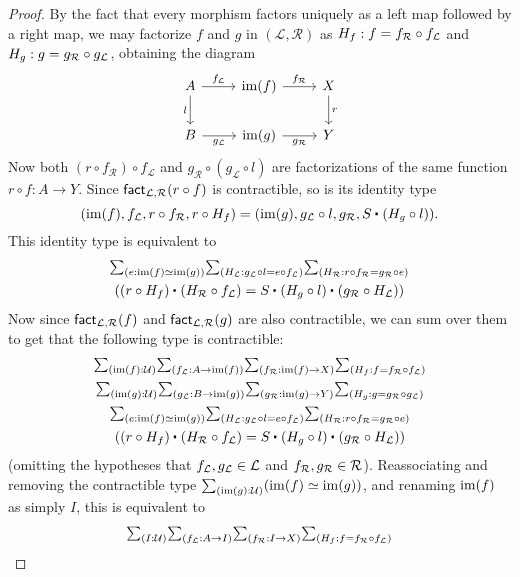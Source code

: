 \begin{proof}
By the fact that every morphism factors uniquely as a left map followed by a
right map, we may factorize $f$ and $g$ in $(\mathcal{L},\mathcal{R})$ as $H_f : f = f_{\mathcal{R}} \circ f_{\mathcal{L}}$ and $H_g : g = g_{\mathcal{R}} \circ g_{\mathcal{L}}$, obtaining the diagram
\begin{equation*}
\begin{tikzcd}
A \arrow[r,"f_{\mathcal{L}}"] \arrow[d,swap,"l"] & \im(f) \arrow[r,"f_{\mathcal{R}}"] & X \arrow[d,"r"] \\
B \arrow[r,swap,"g_{\mathcal{L}}"] & \im(g) \arrow[r,swap,"g_{\mathcal{R}}"] & Y
\end{tikzcd}
\end{equation*}
Now both $(r\circ f_{\mathcal{R}})\circ f_{\mathcal{L}}$ and
$g_{\mathcal{R}}\circ(g_{\mathcal{L}}\circ l)$ are factorizations
of the same function $r\circ f:A\to Y$.
Since $\mathsf{fact}_{\mathcal{L},\mathcal{R}}(r\circ f)$ is contractible, so is its identity type
\[ (\im(f), f_\cL, r\circ f_\cR, r\circ H_f) = (\im(g), g_\cL \circ l, g_\cR, \ct{S}{(H_g\circ l)}). \]
This identity type is equivalent to
\begin{multline*}
\sm{e:\im(f) \simeq \im(g)}{H_\cL : g_\cL \circ l = e\circ f_\cL}{H_\cR : r\circ f_\cR = g_\cR\circ e}\\
(\ct{(r\circ H_f)}{(H_\cR \circ f_\cL)} = \ct S{\ct{(H_g \circ l)}{(g_\cR \circ H_\cL)}})
\end{multline*}
Now since $\mathsf{fact}_{\mathcal{L},\mathcal{R}}(f)$ and $\mathsf{fact}_{\mathcal{L},\mathcal{R}}(g)$ are also contractible, we can sum over them to get that the following type is contractible:
\begin{multline*}
  \sm{\im(f):\UU}{f_\cL : A \to \im(f)}{f_\cR : \im(f) \to X}{H_f : f = f_\cR \circ f_\cL}\\
  \sm{\im(g):\UU}{g_\cL : B \to \im(g)}{g_\cR : \im(g) \to Y}{H_g : g = g_\cR \circ g_\cL}\\
\sm{e:\im(f) \simeq \im(g)}{H_\cL : g_\cL \circ l = e\circ f_\cL}{H_\cR : r\circ f_\cR = g_\cR\circ e}\\
(\ct{(r\circ H_f)}{(H_\cR \circ f_\cL)} = \ct S{\ct{(H_g \circ l)}{(g_\cR \circ H_\cL)}})
\end{multline*}
(omitting the hypotheses that $f_{\mathcal{L}},g_{\mathcal{L}}\in\mathcal{L}$ and $f_{\mathcal{R}},g_{\mathcal{R}}\in\mathcal{R}$).
Reassociating and removing the contractible type $\sm{\im(g):\UU}(\im(f) \simeq \im(g))$, and renaming $\operatorname{im}(f)$ as simply $I$, this is equivalent to
\begin{multline*}
  \sm{I:\UU}{f_\cL : A \to I}{f_\cR : I \to X}{H_f : f = f_\cR \circ f_\cL}\\

\end{multline*}
\end{proof}
